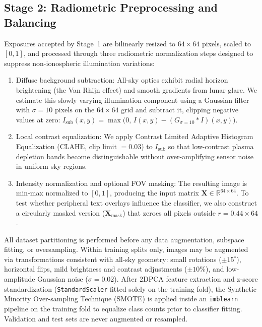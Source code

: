 \subsection{Stage 2: Radiometric Preprocessing and Balancing}

Exposures accepted by Stage~1 are bilinearly resized to $64 \times 64$ pixels, scaled to $[0, 1]$, and processed through three radiometric normalization steps designed to suppress non-ionospheric illumination variations:
\begin{enumerate}
    \item Diffuse background subtraction: All-sky optics exhibit radial horizon brightening (the Van Rhijn effect) and smooth gradients from lunar glare. We estimate this slowly varying illumination component using a Gaussian filter with $\sigma = 10\text{ pixels}$ on the $64 \times 64$ grid and subtract it, clipping negative values at zero: $I_{\text{sub}}(x,y) = \max\!\big(0,\, I(x,y) - (G_{\sigma=10} * I)(x,y)\big)$.
    \item Local contrast equalization: We apply Contrast Limited Adaptive Histogram Equalization (CLAHE, clip limit $= 0.03$) to $I_{\text{sub}}$ so that low-contrast plasma depletion bands become distinguishable without over-amplifying sensor noise in uniform sky regions.
    \item Intensity normalization and optional FOV masking: The resulting image is min-max normalized to $[0, 1]$, producing the input matrix $\mathbf{X} \in \mathbb{R}^{64 \times 64}$. To test whether peripheral text overlays influence the classifier, we also construct a circularly masked version ($\mathbf{X}_{\text{mask}}$) that zeroes all pixels outside $r = 0.44 \times 64$.
\end{enumerate}

All dataset partitioning is performed before any data augmentation, subspace fitting, or oversampling. Within training splits only, images may be augmented via transformations consistent with all-sky geometry: small rotations ($\pm 15^\circ$), horizontal flips, mild brightness and contrast adjustments ($\pm 10\%$), and low-amplitude Gaussian noise ($\sigma = 0.02$). After 2DPCA feature extraction and z-score standardization (\texttt{StandardScaler} fitted solely on the training fold), the Synthetic Minority Over-sampling Technique (SMOTE) \cite{chawla2002smote} is applied inside an \texttt{imblearn} pipeline on the training fold to equalize class counts prior to classifier fitting. Validation and test sets are never augmented or resampled.

